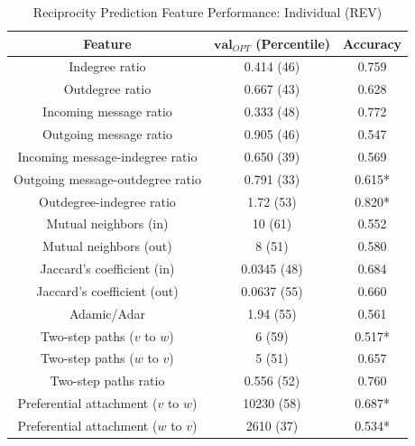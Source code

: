 \documentclass[conference]{IEEEtran}
\begin{document}
\begin{table}[!t]
\renewcommand{\arraystretch}{1.3}
\caption{Reciprocity Prediction Feature Performance: Individual (REV)}
\label{table_recresults_indiv}
\centering
\begin{tabular}{|c||c|c|}
\hline
\bf{Feature} & $\mathbf{val}_{OPT}$ (Percentile) & \bf{Accuracy} \\
\hline
Indegree ratio & 0.414 (46) & 0.759 \\
Outdegree ratio & 0.667 (43) & 0.628 \\
\hline
Incoming message ratio & 0.333 (48) & 0.772 \\
Outgoing message ratio & 0.905 (46) & 0.547 \\
\hline
Incoming message-indegree ratio & 0.650 (39) & 0.569 \\
Outgoing message-outdegree ratio & 0.791 (33) & 0.615* \\
\hline
Outdegree-indegree ratio & 1.72 (53) & 0.820* \\
\hline
Mutual neighbors (in) & 10 (61) & 0.552 \\
Mutual neighbors (out) & 8 (51) & 0.580 \\
\hline
Jaccard's coefficient (in) & 0.0345 (48) & 0.684 \\
Jaccard's coefficient (out) & 0.0637 (55) & 0.660 \\
\hline
Adamic/Adar & 1.94 (55) & 0.561 \\
\hline
Two-step paths ($v$ to $w$) & 6 (59) & 0.517* \\
Two-step paths ($w$ to $v$) & 5 (51) & 0.657 \\
Two-step paths ratio & 0.556 (52) & 0.760 \\
\hline
Preferential attachment ($v$ to $w$) & 10230 (58) & 0.687* \\
Preferential attachment ($w$ to $v$) & 2610 (37) & 0.534* \\
\hline
\end{tabular}
\end{table}
\end{document}
